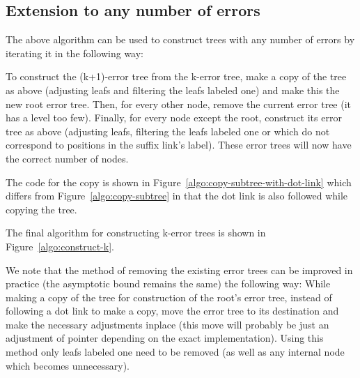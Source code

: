 \subsection{Extension to any number of errors}

The above algorithm can be used to construct trees with any number of errors by iterating it in the following way:

To construct the (k+1)-error tree from the k-error tree, make a copy of the tree as above (adjusting leafs and filtering the leafs labeled one) and make this the new root error tree. Then, for every other node, remove the current error tree (it has a level too few). Finally, for every node except the root, construct its error tree as above (adjusting leafs, filtering the leafs labeled one or which do not correspond to positions in the suffix link's label). These error trees will now have the correct number of nodes.



The code for the copy is shown in Figure~\ref{algo:copy-subtree-with-dot-link} which differs from Figure~\ref{algo:copy-subtree} in that the dot link is also followed while copying the tree.



The final algorithm for constructing k-error trees is shown in Figure~\ref{algo:construct-k}.

We note that the method of removing the existing error trees can be improved in practice (the asymptotic bound remains the same) the following way: While making a copy of the tree for construction of the root's error tree, instead of following a dot link to make a copy, move the error tree to its destination and make the necessary adjustments inplace (this move will probably be just an adjustment of pointer depending on the exact implementation). Using this method only leafs labeled one need to be removed (as well as any internal node which becomes unnecessary).

